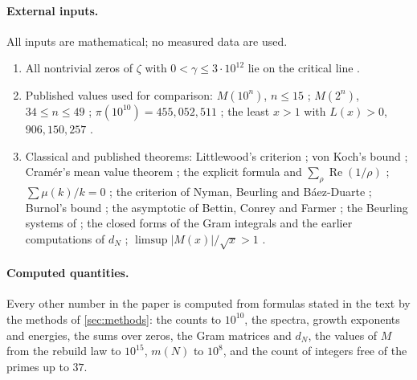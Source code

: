 \documentclass[11pt]{article}
\theoremstyle{definition}\newtheorem{definition}[theorem]{Definition}
\theoremstyle{remark}\newtheorem{remark}[theorem]{Remark}
\renewcommand{\Re}{\operatorname{Re}}\renewcommand{\Im}{\operatorname{Im}}
\begin{document}
\paragraph{External inputs.} All inputs are mathematical; no measured data are used.
\begin{enumerate}[label=(\roman*)]
\item All nontrivial zeros of $\zeta$ with $0<\gamma\le3\cdot10^{12}$ lie on the critical line \cite{PT}.
\item Published values used for comparison: $M(10^n)$, $n\le15$ \cite{OEISM}; $M(2^n)$, $34\le n\le49$ \cite{OEISM2}; $\pi(10^{10})=455{,}052{,}511$ \cite{OEISpi}; the least $x>1$ with $L(x)>0$, $906{,}150{,}257$ \cite{Tanaka}.
\item Classical and published theorems: Littlewood's criterion \cite[\S14.25]{Titchmarsh}; von Koch's bound \cite{vonKoch}; Cramér's mean value theorem \cite{Cramer}; the explicit formula and $\sum_\rho\Re(1/\rho)$ \cite{Davenport}; $\sum\mu(k)/k=0$ \cite{Apostol}; the criterion of Nyman, Beurling and B\'aez-Duarte \cite{Beurling,BaezDuarte}; Burnol's bound \cite{Burnol}; the asymptotic of Bettin, Conrey and Farmer \cite{BCF}; the Beurling systems of \cite{DMV,BDR}; the closed forms of the Gram integrals \cite{Vasyunin} and the earlier computations of $d_N$ \cite{LandreauRichard}; $\limsup|M(x)|/\sqrt x>1$ \cite{OdlyzkoTeRiele}.
\end{enumerate}
\paragraph{Computed quantities.} Every other number in the paper is computed from formulas stated in the text by the methods of \cref{sec:methods}: the counts to $10^{10}$, the spectra, growth exponents and energies, the sums over zeros, the Gram matrices and $d_N$, the values of $M$ from the rebuild law to $10^{15}$, $m(N)$ to $10^8$, and the count of integers free of the primes up to $37$.
\end{document}
